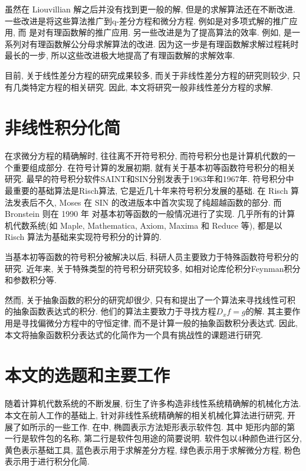虽然在 Liouvillian 解之后并没有找到更一般的解, 但是的求解算法还在不断改进. 一些改进是将这些算法推广到q-差分方程和微分方程. 例如是对多项式解的推广应用, 而 是对有理函数解的推广应用. 另一些改进是为了提高算法的效率. 例如,  是一系列对有理函数解公分母求解算法的改进. 因为这一步是有理函数解求解过程耗时最长的一步, 所以这些改进极大地提高了有理函数解的求解效率. 

目前, 关于线性差分方程的研究成果较多, 而关于非线性差分方程的研究则较少, 只有几类特定方程的相关研究\cite{chen2011some,ishizaki2011difference}. 因此, 本文将研究一般非线性差分方程的求解. 

\section{非线性积分化简}
在求微分方程的精确解时, 往往离不开符号积分, 而符号积分也是计算机代数的一个重要组成部分. 在符号计算的发展初期, 就有关于基本初等函数符号积分的相关研究. 最早的符号积分软件SAINT和SIN分别发表于1963年\cite{slagle1963}和1967年\cite{moses1967}. 符号积分中最重要的基础算法是Risch算法\cite{risch1969,risch1970}, 它是近几十年来符号积分发展的基础. 在 Risch 算法发表后不久, Moses 在 SIN 的改进版本中首次实现了纯超越函数的部分\cite{moses1971}. 而 Bronstein 则在 1990 年\cite{bronstein1990} 对基本初等函数的一般情况进行了实现. 几乎所有的计算机代数系统(如 Maple, Mathematica, Axiom, Maxima 和 Reduce 等), 都是以 Risch 算法为基础来实现符号积分的计算的. 

当基本初等函数的符号积分被解决以后, 科研人员主要致力于特殊函数符号积分的研究\cite{cherry1985,cherry1986,bertrand1994,jeffrey1997}. 近年来, 关于特殊类型的符号积分研究较多, 如相对论库伦积分\cite{paule2012,paule2013}\D Feynman积分\cite{blumlein2012,smirnov2015}和参数积分\cite{raab2016}等.

然而, 关于抽象函数的积分的研究却很少, 只有和提出了一个算法来寻找线性可积的抽象函数表达式的积分. 他们的算法主要致力于寻找方程$D_x f=g$的解. 其主要作用是寻找偏微分方程中的守恒定律\cite{poole2011}, 而不是计算一般的抽象函数积分表达式. 因此, 本文将抽象函数积分表达式的化简作为一个具有挑战性的课题进行研究.

\section{本文的选题和主要工作}
随着计算机代数系统的不断发展, 衍生了许多构造非线性系统精确解的机械化方法. 本文在前人工作的基础上, 针对非线性系统精确解的相关机械化算法进行研究, 开展了如所示的一些工作. 在中, 椭圆表示方法\D 矩形表示软件包. 其中 矩形内部的第一行是软件包的名称, 第二行是软件包用途的简要说明. 软件包以4种颜色进行区分, 黄色表示基础工具, 蓝色表示用于求解差分方程, 绿色表示用于求解微分方程, 粉色表示用于进行积分化简. 

